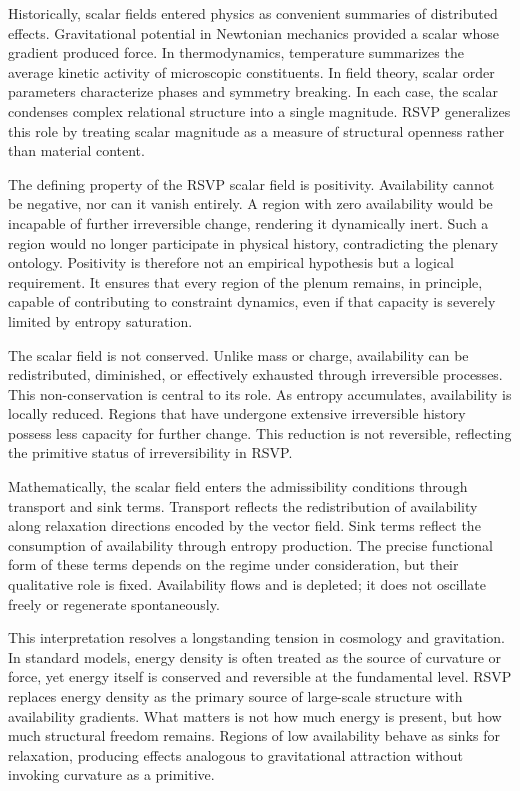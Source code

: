 \documentclass[11pt,oneside]{book}
\begin{document}
Historically, scalar fields entered physics as convenient summaries of distributed effects. Gravitational potential in Newtonian mechanics provided a scalar whose gradient produced force. In thermodynamics, temperature summarizes the average kinetic activity of microscopic constituents. In field theory, scalar order parameters characterize phases and symmetry breaking. In each case, the scalar condenses complex relational structure into a single magnitude. RSVP generalizes this role by treating scalar magnitude as a measure of structural openness rather than material content.

The defining property of the RSVP scalar field is positivity. Availability cannot be negative, nor can it vanish entirely. A region with zero availability would be incapable of further irreversible change, rendering it dynamically inert. Such a region would no longer participate in physical history, contradicting the plenary ontology. Positivity is therefore not an empirical hypothesis but a logical requirement. It ensures that every region of the plenum remains, in principle, capable of contributing to constraint dynamics, even if that capacity is severely limited by entropy saturation.

The scalar field is not conserved. Unlike mass or charge, availability can be redistributed, diminished, or effectively exhausted through irreversible processes. This non-conservation is central to its role. As entropy accumulates, availability is locally reduced. Regions that have undergone extensive irreversible history possess less capacity for further change. This reduction is not reversible, reflecting the primitive status of irreversibility in RSVP.

Mathematically, the scalar field enters the admissibility conditions through transport and sink terms. Transport reflects the redistribution of availability along relaxation directions encoded by the vector field. Sink terms reflect the consumption of availability through entropy production. The precise functional form of these terms depends on the regime under consideration, but their qualitative role is fixed. Availability flows and is depleted; it does not oscillate freely or regenerate spontaneously.

This interpretation resolves a longstanding tension in cosmology and gravitation. In standard models, energy density is often treated as the source of curvature or force, yet energy itself is conserved and reversible at the fundamental level. RSVP replaces energy density as the primary source of large-scale structure with availability gradients. What matters is not how much energy is present, but how much structural freedom remains. Regions of low availability behave as sinks for relaxation, producing effects analogous to gravitational attraction without invoking curvature as a primitive.
\end{document}
